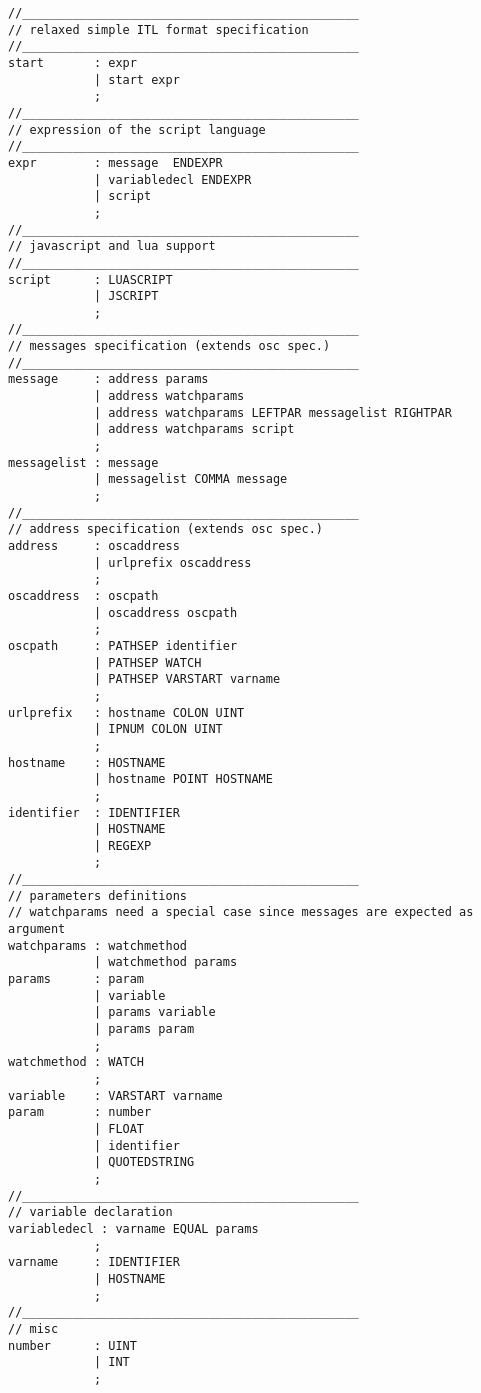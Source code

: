 \begin{verbatim}
//_______________________________________________
// relaxed simple ITL format specification
//_______________________________________________
start		: expr
			| start expr
			;
//_______________________________________________
// expression of the script language
//_______________________________________________
expr		: message  ENDEXPR		
			| variabledecl ENDEXPR	
			| script			
			;
//_______________________________________________
// javascript and lua support
//_______________________________________________
script		: LUASCRIPT			
			| JSCRIPT			
			;
//_______________________________________________
// messages specification (extends osc spec.)
//_______________________________________________
message		: address params			
			| address watchparams		
			| address watchparams LEFTPAR messagelist RIGHTPAR
			| address watchparams script 
			;
messagelist : message					
			| messagelist COMMA message 
			;
//_______________________________________________
// address specification (extends osc spec.)
address		: oscaddress				
			| urlprefix oscaddress		
			;
oscaddress	: oscpath					
			| oscaddress oscpath		
			;
oscpath		: PATHSEP identifier		
			| PATHSEP WATCH				
			| PATHSEP VARSTART varname	
			;
urlprefix	: hostname COLON UINT		
			| IPNUM COLON UINT			
			;
hostname	: HOSTNAME					
			| hostname POINT HOSTNAME	
			;
identifier	: IDENTIFIER		
			| HOSTNAME			
			| REGEXP			
			;
//_______________________________________________
// parameters definitions
// watchparams need a special case since messages are expected as argument
watchparams	: watchmethod		
			| watchmethod params 
params		: param				
			| variable			
			| params variable	
			| params param		
			;
watchmethod	: WATCH				
			;
variable	: VARSTART varname	
param		: number			
			| FLOAT				
			| identifier		
			| QUOTEDSTRING		
			;
//_______________________________________________
// variable declaration
variabledecl : varname EQUAL params	
			;
varname		: IDENTIFIER			
			| HOSTNAME				
			;
//_______________________________________________
// misc
number		: UINT					
			| INT					
			;
\end{verbatim}
